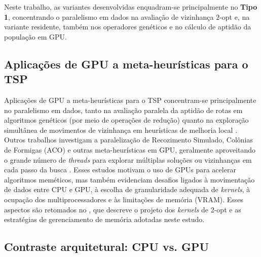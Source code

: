 Neste trabalho, as variantes desenvolvidas enquadram-se principalmente no \textbf{Tipo 1}, concentrando o paralelismo em dados na avaliação de vizinhança \(2\)-opt e, na variante residente, também nos operadores genéticos e no cálculo de aptidão da população em GPU.

\subsection{Aplicações de GPU a meta-heurísticas para o TSP}\label{sec-262-gpu-aplicacoes-tsp}

Aplicações de GPU a meta-heurísticas para o TSP concentram-se principalmente no paralelismo em dados, tanto na avaliação paralela da aptidão de rotas em algoritmos genéticos (por meio de operações de redução) quanto na exploração simultânea de movimentos de vizinhança em heurísticas de melhoria local \autocite{schulz2013gpu,tsp_gpu,fujimoto2011highly}.
Outros trabalhos investigam a paralelização de Recozimento Simulado, Colônias de Formigas (ACO) e outras meta-heurísticas em GPU, geralmente aproveitando o grande número de \emph{threads} para explorar múltiplas soluções ou vizinhanças em cada passo da busca \autocite{binjubier2024gpu,rey2018cpu,abdelatti2020improvedgpuheuristic}.
Esses estudos motivam o uso de GPUs para acelerar algoritmos meméticos, mas também evidenciam desafios ligados à movimentação de dados entre CPU e GPU, à escolha de granularidade adequada de \emph{kernels}, à ocupação dos multiprocessadores e às limitações de memória (VRAM).
Esses aspectos são retomados no , que descreve o projeto dos \emph{kernels} de \(2\)-opt e as estratégias de gerenciamento de memória adotadas neste estudo.

\subsection{Contraste arquitetural: CPU vs. GPU}\label{sec-263-cpu-vs-gpu}

